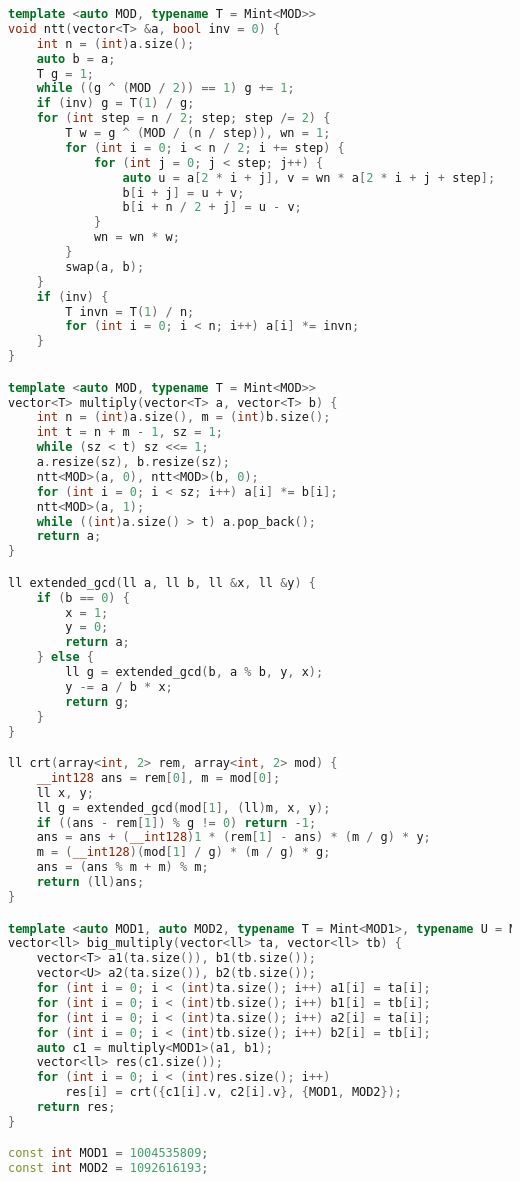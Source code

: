 \documentclass[10pt, a4paper, oneside]{book}
\begin{document}
\begin{lstlisting}[language=C++]
template <auto MOD, typename T = Mint<MOD>>
void ntt(vector<T> &a, bool inv = 0) {
    int n = (int)a.size();
    auto b = a;
    T g = 1;
    while ((g ^ (MOD / 2)) == 1) g += 1;
    if (inv) g = T(1) / g;
    for (int step = n / 2; step; step /= 2) {
        T w = g ^ (MOD / (n / step)), wn = 1;
        for (int i = 0; i < n / 2; i += step) {
            for (int j = 0; j < step; j++) {
                auto u = a[2 * i + j], v = wn * a[2 * i + j + step];
                b[i + j] = u + v;
                b[i + n / 2 + j] = u - v;
            }
            wn = wn * w;
        }
        swap(a, b);
    }
    if (inv) {
        T invn = T(1) / n;
        for (int i = 0; i < n; i++) a[i] *= invn;
    }
}

template <auto MOD, typename T = Mint<MOD>>
vector<T> multiply(vector<T> a, vector<T> b) {
    int n = (int)a.size(), m = (int)b.size();
    int t = n + m - 1, sz = 1;
    while (sz < t) sz <<= 1;
    a.resize(sz), b.resize(sz);
    ntt<MOD>(a, 0), ntt<MOD>(b, 0);
    for (int i = 0; i < sz; i++) a[i] *= b[i];
    ntt<MOD>(a, 1);
    while ((int)a.size() > t) a.pop_back();
    return a;
}

ll extended_gcd(ll a, ll b, ll &x, ll &y) {
    if (b == 0) {
        x = 1;
        y = 0;
        return a;
    } else {
        ll g = extended_gcd(b, a % b, y, x);
        y -= a / b * x;
        return g;
    }
}

ll crt(array<int, 2> rem, array<int, 2> mod) {
    __int128 ans = rem[0], m = mod[0];
    ll x, y;
    ll g = extended_gcd(mod[1], (ll)m, x, y);
    if ((ans - rem[1]) % g != 0) return -1;
    ans = ans + (__int128)1 * (rem[1] - ans) * (m / g) * y;
    m = (__int128)(mod[1] / g) * (m / g) * g;
    ans = (ans % m + m) % m;
    return (ll)ans;
}

template <auto MOD1, auto MOD2, typename T = Mint<MOD1>, typename U = Mint<MOD2>>
vector<ll> big_multiply(vector<ll> ta, vector<ll> tb) {
    vector<T> a1(ta.size()), b1(tb.size());
    vector<U> a2(ta.size()), b2(tb.size());
    for (int i = 0; i < (int)ta.size(); i++) a1[i] = ta[i];
    for (int i = 0; i < (int)tb.size(); i++) b1[i] = tb[i];
    for (int i = 0; i < (int)ta.size(); i++) a2[i] = ta[i];
    for (int i = 0; i < (int)tb.size(); i++) b2[i] = tb[i];
    auto c1 = multiply<MOD1>(a1, b1);
    vector<ll> res(c1.size());
    for (int i = 0; i < (int)res.size(); i++)
        res[i] = crt({c1[i].v, c2[i].v}, {MOD1, MOD2});
    return res;
}

const int MOD1 = 1004535809;
const int MOD2 = 1092616193;\end{lstlisting}
\hfill
\end{document}
